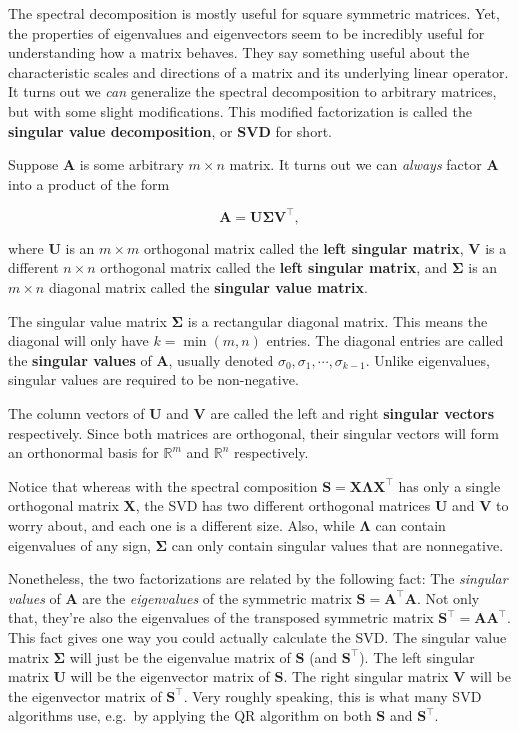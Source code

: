 \documentclass[
  letterpaper,
  DIV=11,
  numbers=noendperiod]{scrreprt}
\begin{document}
The spectral decomposition is mostly useful for square symmetric
matrices. Yet, the properties of eigenvalues and eigenvectors seem to be
incredibly useful for understanding how a matrix behaves. They say
something useful about the characteristic scales and directions of a
matrix and its underlying linear operator. It turns out we \emph{can}
generalize the spectral decomposition to arbitrary matrices, but with
some slight modifications. This modified factorization is called the
\textbf{singular value decomposition}, or \textbf{SVD} for short.

Suppose \(\mathbf{A}\) is some arbitrary \(m \times n\) matrix. It turns
out we can \emph{always} factor \(\mathbf{A}\) into a product of the
form

\[\mathbf{A} = \mathbf{U} \mathbf{\Sigma} \mathbf{V}^\top,\]

where \(\mathbf{U}\) is an \(m \times m\) orthogonal matrix called the
\textbf{left singular matrix}, \(\mathbf{V}\) is a different
\(n \times n\) orthogonal matrix called the \textbf{left singular
matrix}, and \(\mathbf{\Sigma}\) is an \(m \times n\) diagonal matrix
called the \textbf{singular value matrix}.

The singular value matrix \(\mathbf{\Sigma}\) is a rectangular diagonal
matrix. This means the diagonal will only have \(k=\min(m, n)\) entries.
The diagonal entries are called the \textbf{singular values} of
\(\mathbf{A}\), usually denoted
\(\sigma_0, \sigma_1, \cdots, \sigma_{k-1}\). Unlike eigenvalues,
singular values are required to be non-negative.

The column vectors of \(\mathbf{U}\) and \(\mathbf{V}\) are called the
left and right \textbf{singular vectors} respectively. Since both
matrices are orthogonal, their singular vectors will form an orthonormal
basis for \(\mathbb{R}^m\) and \(\mathbb{R}^n\) respectively.

Notice that whereas with the spectral composition
\(\mathbf{S} = \mathbf{X} \mathbf{\Lambda} \mathbf{X}^\top\) has only a
single orthogonal matrix \(\mathbf{X}\), the SVD has two different
orthogonal matrices \(\mathbf{U}\) and \(\mathbf{V}\) to worry about,
and each one is a different size. Also, while \(\mathbf{\Lambda}\) can
contain eigenvalues of any sign, \(\mathbf{\Sigma}\) can only contain
singular values that are nonnegative.

Nonetheless, the two factorizations are related by the following fact:
The \emph{singular values} of \(\mathbf{A}\) are the \emph{eigenvalues}
of the symmetric matrix \(\mathbf{S} = \mathbf{A}^\top \mathbf{A}\). Not
only that, they're also the eigenvalues of the transposed symmetric
matrix \(\mathbf{S}^\top = \mathbf{A} \mathbf{A}^\top\). This fact gives
one way you could actually calculate the SVD. The singular value matrix
\(\mathbf{\Sigma}\) will just be the eigenvalue matrix of \(\mathbf{S}\)
(and \(\mathbf{S}^\top\)). The left singular matrix \(\mathbf{U}\) will
be the eigenvector matrix of \(\mathbf{S}\). The right singular matrix
\(\mathbf{V}\) will be the eigenvector matrix of \(\mathbf{S}^\top\).
Very roughly speaking, this is what many SVD algorithms use, e.g.~by
applying the QR algorithm on both \(\mathbf{S}\) and
\(\mathbf{S}^\top\).
\end{document}
